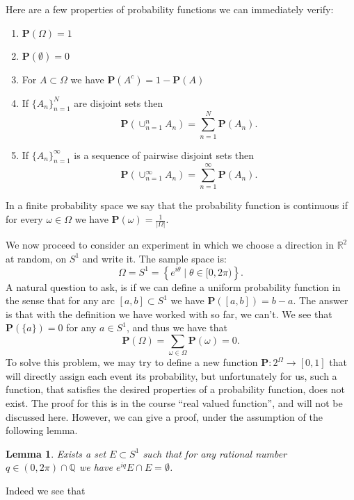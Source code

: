 \documentclass[11pt,a4paper]{article}
\theoremstyle{definition}
\theoremstyle{plain}
\newtheorem{lemma}[theorem]{Lemma}
\newcommand{\Q}{\mathbb{Q}}
\newcommand{\R}{\mathbb{R}}
\newcommand{\set}[2]{ \left\{ #1 \mid #2 \right\} }
\begin{document}
  Here are a few properties of probability functions we can immediately 
  verify:
  \begin{enumerate}
    \item $\mathbf P(\Omega) = 1$
    \item $\mathbf P(\emptyset) = 0$
    \item For $A \subset \Omega$ we have $\mathbf P(A^c) = 1 - \mathbf P(A)$
    \item If $\{A_n\}_{n=1}^{N}$ are disjoint sets then 
      \[
        \mathbf P\left(\cup_{n=1}^{n}{A_n}\right) = 
        \sum_{n=1}^{N}{\mathbf P(A_n)}.
      \]
    \item If $\{A_n\}_{n=1}^{\infty}$ is a sequence of pairwise disjoint sets 
      then
      \[
        \mathbf P\left(\cup_{n=1}^{\infty}{A_n}\right) = 
        \sum_{n=1}^{\infty}{\mathbf P(A_n)}.
      \]
  \end{enumerate}

  In a finite probability space we say that the probability function is
  continuous if for every $\omega \in \Omega$ we have 
  $\mathbf P(\omega) = \frac{1}{|\Omega|}$.

  We now proceed to consider an experiment in which we choose a direction in
  $\R^2$ at random, on $S^1$ and write it. The sample space is:
  \[
    \Omega = S^1 = \set{e^{i \theta}}{\theta \in [0,2 \pi)}.
  \]
  A natural question to ask, is if we can define a uniform probability function
  in the sense that for any arc $[a,b] \subset S^1$ we have 
  $\mathbf P([a,b]) = b - a$. The answer is that with the definition we have
  worked with so far, we can't. We see that $\mathbf P(\{a\}) = 0$ for 
  any $a \in S^1$, and thus we have that
  \[
    \mathbf P(\Omega) = \sum_{\omega \in \Omega}{\mathbf P(\omega)} = 0.
  \]
  To solve this problem, we may try to define a new function $\mathbf P \colon 
  2^\Omega \to [0,1]$ that will directly assign each event its probability,
  but unfortunately for us, such a function, that satisfies the desired
  properties of a probability function, does not exist. The proof for this
  is in the course ``real valued function'', and will not be discussed here.
  However, we can give a proof, under the assumption of the following lemma.

  \begin{lemma}
    Exists a set $E \subset S^1$ such that for any rational number 
    $q \in (0, 2 \pi) \cap \Q$ we have $e^{i q}E \cap E = \emptyset$.
  \end{lemma}

  Indeed we see that
\end{document}
